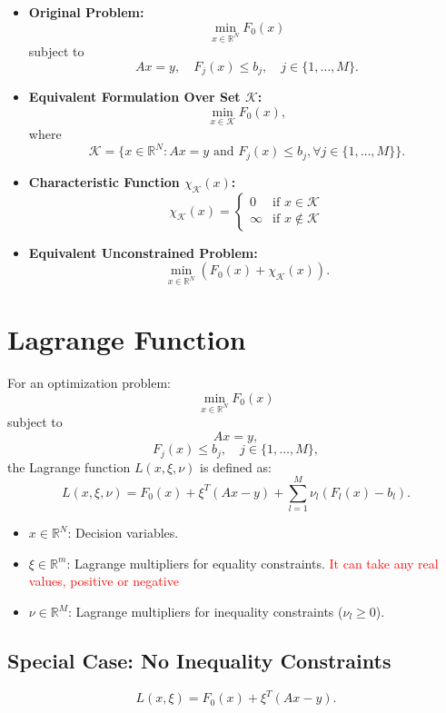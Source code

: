 \documentclass{article}
\begin{document}
\begin{itemize}
    \item \textbf{Original Problem:}
    \[
    \min_{x \in \mathbb{R}^N} F_0(x) 
    \]
    subject to 
    \[
    Ax = y, \quad F_j(x) \leq b_j, \quad j \in \{1, \ldots, M\}.
    \]

    \item \textbf{Equivalent Formulation Over Set \(\mathcal{K}\):}
    \[
    \min_{x \in \mathcal{K}} F_0(x),
    \]
    where 
    \[
    \mathcal{K} = \{x \in \mathbb{R}^N: Ax = y \text{ and } F_j(x) \leq b_j, \forall j \in \{1, \ldots, M\}\}.
    \]

    \item \textbf{Characteristic Function \(\chi_{\mathcal{K}}(x)\):}
    \[
    \chi_{\mathcal{K}}(x) = 
    \begin{cases} 
        0 & \text{if } x \in \mathcal{K} \\ 
        \infty & \text{if } x \notin \mathcal{K} 
    \end{cases}
    \]

    \item \textbf{Equivalent Unconstrained Problem:}
    \[
    \min_{x \in \mathbb{R}^N} \left( F_0(x) + \chi_{\mathcal{K}}(x) \right).
    \]
\end{itemize}




\section*{Lagrange Function}

For an optimization problem:
\[
\min_{x \in \mathbb{R}^N} F_0(x)
\]
subject to
\[
Ax = y,
\]
\[
F_j(x) \leq b_j, \quad j \in \{1, \ldots, M\},
\]
the Lagrange function \(L(x, \xi, \nu)\) is defined as:
\[
L(x, \xi, \nu) = F_0(x) + \xi^T(Ax - y) + \sum_{l=1}^M \nu_l (F_l(x) - b_l).
\]

\begin{itemize}
    \item \(x \in \mathbb{R}^N\): Decision variables.
    \item \(\xi \in \mathbb{R}^m\): Lagrange multipliers for equality constraints. \textcolor{red}{ It can take any real values, positive or negative}
    \item \(\nu \in \mathbb{R}^M\): Lagrange multipliers for inequality constraints (\(\nu_l \geq 0\)).
\end{itemize}

\subsection*{Special Case: No Inequality Constraints}
\[
L(x, \xi) = F_0(x) + \xi^T(Ax - y).
\]
\end{document}
